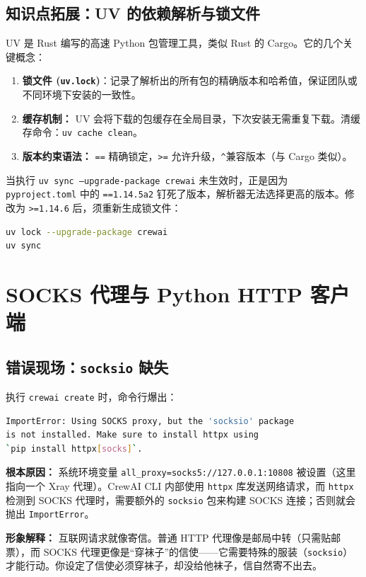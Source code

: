 \documentclass[12pt,a4paper]{ctexart}
\begin{document}
\subsection{知识点拓展：UV 的依赖解析与锁文件}
UV 是 Rust 编写的高速 Python 包管理工具，类似 Rust 的 Cargo。它的几个关键概念：
\begin{enumerate}[label=\arabic*.]
    \item \textbf{锁文件 (\texttt{uv.lock})}：记录了解析出的所有包的精确版本和哈希值，保证团队或不同环境下安装的一致性。
    \item \textbf{缓存机制：} UV 会将下载的包缓存在全局目录，下次安装无需重复下载。清缓存命令：\texttt{uv cache clean}。
    \item \textbf{版本约束语法：} \texttt{==} 精确锁定，\texttt{>=} 允许升级，\texttt{\^{}}兼容版本（与 Cargo 类似）。
\end{enumerate}

当执行 \texttt{uv sync --upgrade-package crewai} 未生效时，正是因为 \texttt{pyproject.toml} 中的 \texttt{==1.14.5a2} 钉死了版本，解析器无法选择更高的版本。修改为 \texttt{>=1.14.6} 后，须重新生成锁文件：
\begin{lstlisting}[language=bash]
uv lock --upgrade-package crewai
uv sync
\end{lstlisting}

\section{SOCKS 代理与 Python HTTP 客户端}
\subsection{错误现场：\texttt{socksio} 缺失}
执行 \texttt{crewai create} 时，命令行爆出：
\begin{lstlisting}[language=bash, caption=SOCKS 代理缺失错误]
ImportError: Using SOCKS proxy, but the 'socksio' package 
is not installed. Make sure to install httpx using 
`pip install httpx[socks]`.
\end{lstlisting}

\noindent\textbf{根本原因：} 系统环境变量 \texttt{all\_proxy=socks5://127.0.0.1:10808} 被设置（这里指向一个 Xray 代理）。CrewAI CLI 内部使用 \texttt{httpx} 库发送网络请求，而 \texttt{httpx} 检测到 SOCKS 代理时，需要额外的 \texttt{socksio} 包来构建 SOCKS 连接；否则就会抛出 \texttt{ImportError}。

\noindent\textbf{形象解释：} 互联网请求就像寄信。普通 HTTP 代理像是邮局中转（只需贴邮票），而 SOCKS 代理更像是“穿袜子”的信使——它需要特殊的服装（\texttt{socksio}）才能行动。你设定了信使必须穿袜子，却没给他袜子，信自然寄不出去。
\end{document}

